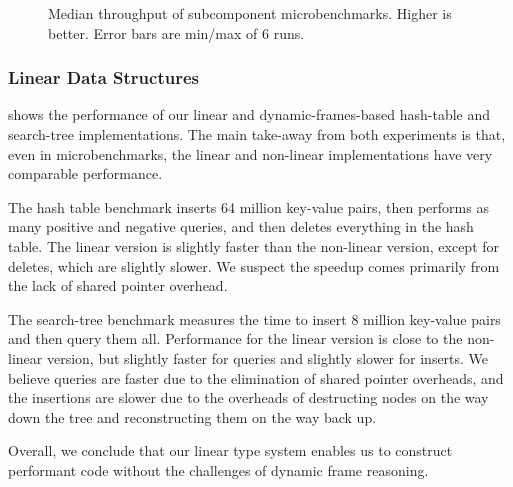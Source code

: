 \begin{figure}
        \caption{Median throughput of subcomponent microbenchmarks.
Higher is better. Error bars are min/max of 6 runs.
}\label{fig:datastructures-micro}
\end{figure}


\subsubsection{Linear Data Structures}

 shows the performance of
our linear and dynamic-frames-based hash-table and search-tree implementations.
%
The main take-away from both experiments is that, even in
microbenchmarks, the linear and non-linear implementations have very
comparable performance.

The hash table benchmark inserts 64 million key-value
pairs, then performs as many positive and negative queries, and then
deletes everything in the hash table.  The linear version is slightly
faster than the non-linear version, except for deletes, which are
slightly slower.  We suspect the speedup comes primarily from the lack
of shared pointer overhead.

The search-tree benchmark measures the time to insert 8 million key-value
pairs and then query them all.  Performance for the linear version is
close to the non-linear version, but slightly faster for queries and
slightly slower for inserts.  We believe queries are faster due to the
elimination of shared pointer overheads, and the insertions are slower
due to the overheads of destructing nodes on the way down the tree and
reconstructing them on the way back up.  

Overall, we conclude that our linear type system enables us to
construct performant code without the challenges of dynamic frame
reasoning.

